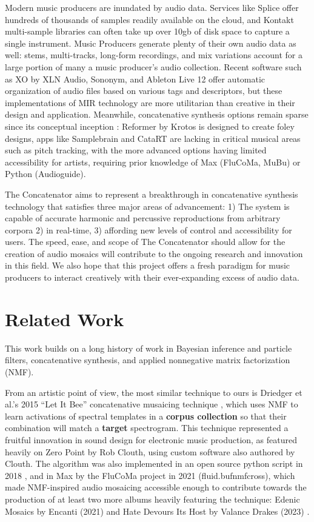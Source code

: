 \documentclass{article}
\begin{document}
Modern music producers are inundated by audio data. Services like Splice offer hundreds of thousands of samples readily available on the cloud, and Kontakt multi-sample libraries can often take up over 10gb of disk space to capture a single instrument. Music Producers generate plenty of their own audio data as well: stems, multi-tracks, long-form recordings, and mix variations account for a large portion of many a music producer's audio collection. Recent software such as XO by XLN Audio, Sononym, and Ableton Live 12 offer automatic organization of audio files based on various tags and descriptors, but these implementations of MIR technology are more utilitarian than creative in their design and application. Meanwhile, concatenative synthesis options remain sparse since its conceptual inception \cite{schwarz2000system}: Reformer by Krotos is designed to create foley designs, apps like Samplebrain and CataRT \cite{schwarz2006real, schwarz2008principles} are lacking in critical musical areas such as pitch tracking, with the more advanced options having limited accessibility for artists, requiring prior knowledge of Max (FluCoMa, MuBu) or Python (Audioguide).

The Concatenator aims to represent a breakthrough in concatenative synthesis technology that satisfies three major areas of advancement: 1) The system is capable of accurate harmonic and percussive reproductions from arbitrary corpora 2) in real-time, 3) affording new levels of control and accessibility for users. The speed, ease, and scope of The Concatenator should allow for the creation of audio mosaics will contribute to the ongoing research and innovation in this field. We also hope that this project offers a fresh paradigm for music producers to interact creatively with their ever-expanding excess of audio data. 

\section{Related Work}
This work builds on a long history of work in Bayesian inference and particle filters, concatenative synthesis, and applied nonnegative matrix factorization (NMF).

From an artistic point of view, the most similar technique to ours is Driedger et al.'s 2015 ``Let It Bee'' concatenative musaicing technique \cite{driedger2015let}, which uses NMF to learn activations of spectral templates in a \textbf{corpus collection} so that their combination will match a \textbf{target} spectrogram. This technique represented a fruitful innovation in sound design for electronic music production, as featured heavily on Zero Point by Rob Clouth\cite{clouth2020}, using custom software also authored by Clouth. The algorithm was also implemented in an open source python script in 2018 \cite{tralie2018}, and in Max by the FluCoMa project in 2021 (fluid.bufnmfcross)\cite{flucoma2021}, which made NMF-inspired audio mosaicing accessible enough to contribute towards the production of at least two more albums heavily featuring the technique: Edenic Mosaics by Encanti (2021) \cite{cantil2021} and Hate Devours Its Host by Valance Drakes (2023) \cite{drakes2023}.
\end{document}
